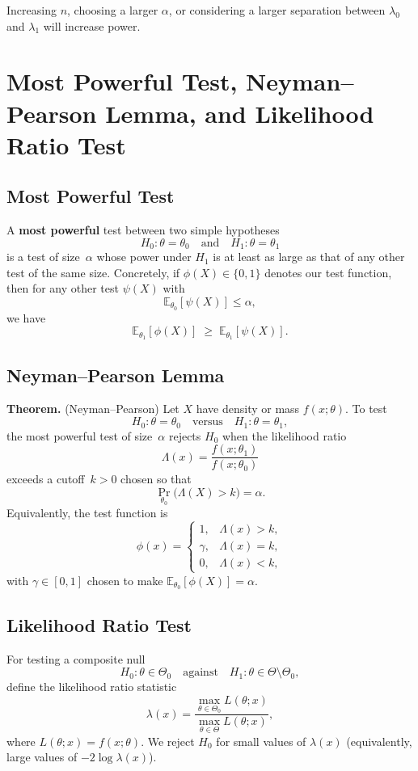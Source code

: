 \documentclass[twoside]{book}
\begin{document}
Increasing $n$, choosing a larger $\alpha$, or considering a larger separation between $\lambda_0$ and $\lambda_1$ will increase power.

\section{Most Powerful Test, Neyman–Pearson Lemma, and Likelihood Ratio Test}

\subsection{Most Powerful Test}
A \textbf{most powerful} test between two simple hypotheses
\[
H_0: \theta = \theta_0
\quad\text{and}\quad
H_1: \theta = \theta_1
\]
is a test of size~$\alpha$ whose power under $H_1$ is at least as large as that of any other test of the same size.  Concretely, if $\phi(X)\in\{0,1\}$ denotes our test function, then for any other test $\psi(X)$ with
\[
\mathbb{E}_{\theta_0}[\psi(X)] \le \alpha,
\]
we have
\[
\mathbb{E}_{\theta_1}[\phi(X)] \;\ge\; \mathbb{E}_{\theta_1}[\psi(X)].
\]

\subsection{Neyman–Pearson Lemma}
\textbf{Theorem.}  (Neyman–Pearson)
Let $X$ have density or mass $f(x;\theta)$.  To test
\[
H_0: \theta=\theta_0
\quad\text{versus}\quad
H_1: \theta=\theta_1,
\]
the most powerful test of size~$\alpha$ rejects $H_0$ when the likelihood ratio
\[
\Lambda(x)
=
\frac{f(x;\theta_1)}{f(x;\theta_0)}
\]
exceeds a cutoff~$k>0$ chosen so that
\[
\Pr_{\theta_0}\bigl(\Lambda(X)>k\bigr)=\alpha.
\]
Equivalently, the test function is
\[
\phi(x)=
\begin{cases}
1, & \Lambda(x)>k,\\
\gamma, & \Lambda(x)=k,\\
0, & \Lambda(x)<k,
\end{cases}
\]
with $\gamma\in[0,1]$ chosen to make $\mathbb{E}_{\theta_0}[\phi(X)]=\alpha$.

\subsection{Likelihood Ratio Test}
For testing a composite null
\[
H_0:\theta\in\Theta_0
\quad\text{against}\quad
H_1:\theta\in\Theta \setminus \Theta_0,
\]
define the likelihood ratio statistic
\[
\lambda(x)
=
\frac{\displaystyle\max_{\theta\in\Theta_0}L(\theta;x)}
{\displaystyle\max_{\theta\in\Theta}L(\theta;x)},
\]
where $L(\theta;x)=f(x;\theta)$.  We reject $H_0$ for small values of $\lambda(x)$ (equivalently, large values of $-2\log\lambda(x)$).
\end{document}
